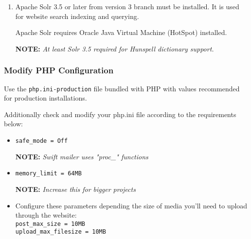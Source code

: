 \documentclass[12pt]{article}
\newcommand{\vigShowNotes}{1}
\newcommand{\note}[1]{
\textbf{NOTE:} 
\textit{#1}
}
\begin{document}
\begin{enumerate}
Recommended PHP extensions:
\begin{itemize}
	\item  \texttt{apc}
\end{itemize}

\note{Most popular extra extensions we forget to add are \texttt{zip} (PHPExcel), \texttt{shmop} (GeoIP), \texttt{soap}, \texttt{ldap}.}

\note{PHP 5.3.3 required because "As of PHP 5.3.3, methods with the same name as the last element of a namespaced class name will no longer be treated as constructor. This change doesn't affect non-namespaced classes.". Some Supra classes might have methods with name equal to classname without intention to work as constructor.}
	
\note{At least 5.3.6 is recommended for correct Mysql charset support on connection options without "SET NAMES" initial request.}

\note{At least 5.3.10 is required because segmentation fault might arise with previous versions when page is loaded in the CMS.}

\item
Apache Solr 3.5 or later from version 3 branch must be installed. It is used for website search indexing and querying.

Apache Solr requires Oracle Java Virtual Machine (HotSpot) installed.

\note{At least Solr 3.5 required for Hunspell dictionary support.}

\end{enumerate}

\subsubsection{Modify PHP Configuration}

Use the \texttt{php.ini-production} file bundled with PHP with values recommended for production installations.

Additionally check and modify your php.ini file according to the requirements below:

\begin{itemize}
	\item \texttt{safe\_mode = Off}
	
	\note{Swift mailer uses "proc\_\*" functions}
	
	\item \texttt{memory\_limit = 64MB}
	
	\note{Increase this for bigger projects}
	
	\item Configure these parameters depending the size of media you'll need to upload through the website:
	\\ \texttt{post\_max\_size = 10MB}
	\\ \texttt{upload\_max\_filesize = 10MB}
	
\end{itemize}
\end{document}
